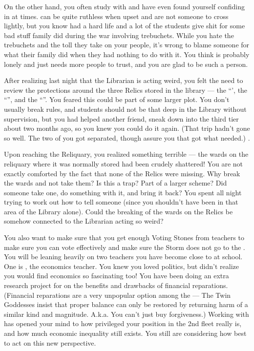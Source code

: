 \documentclass[char]{GL2020}
\begin{document}
On the other hand, you often study with \cLibAssist{} and have even found yourself confiding in \cLibAssist{\them} at times. \cLibAssist{\They} can be quite ruthless when upset and are not someone to cross lightly, but you know \cLibAssist{\theyhave} had a hard life and a lot of the students give \cLibAssist{\them} shit for some bad stuff \cLibAssist{\their} family did during the war involving trebuchets. While you hate the trebuchets and the toll they take on your people, it's wrong to blame someone for what their family did when they had nothing to do with it. You think \cLibAssist{} is probably lonely and just needs more people to trust, and you are glad to be such a person. 

After realizing last night that the Librarian is acting weird, you felt the need to review the protections around the three Relics stored in the library — the ``\iNet{}', the ``\iLariat{}'', and the ``\iScythe{}''. You feared this could be part of some larger plot. You don't usually break rules, and students should not be that deep in the Library without supervision, but you had helped another friend, \cChupStudent{\full} sneak down into the third tier about two months ago, so you knew you could do it again. (That trip hadn’t gone so well. The two of you got separated, though \cChupStudent{\they} assure\cChupStudent{\verbs} you that \cChupStudent{\they} got what \cChupStudent{\they} needed.) . 

Upon reaching the Reliquary, you realized something terrible — the wards on the reliquary where it was normally stored had been crudely shattered! You are not exactly comforted by the fact that none of the Relics were missing. Why break the wards and not take them? Is this a trap? Part of a larger scheme? Did someone take one, do something with it, and bring it back? You spent all night trying to work out how to tell someone (since you shouldn't have been in that area of the Library alone). Could the breaking of the wards on the Relics be somehow connected to the Librarian acting so weird?

You also want to make sure that you get enough Voting Stones from teachers to make sure you can vote effectively and make sure the Storm does not go to the \pShip{}. You will be leaning heavily on two teachers you have become close to at school. One is \cChupSecond{\full}, the economics teacher. You knew you loved politics, but didn’t realize you would find economics so fascinating too! You have been doing an extra research project for \cChupSecond{\them} on the benefits and drawbacks of financial reparations. (Financial reparations are a very unpopular option among the \pShippies{} — The Twin Goddesses insist that proper balance can only be restored by returning harm of a similar kind and magnitude. A.k.a. You can’t just buy forgiveness.) Working with \cChupSecond{\them} has opened your mind to how privileged your position in the 2nd fleet really is, and how much economic inequality still exists. You still are considering how best to act on this new perspective. 
\end{document}
